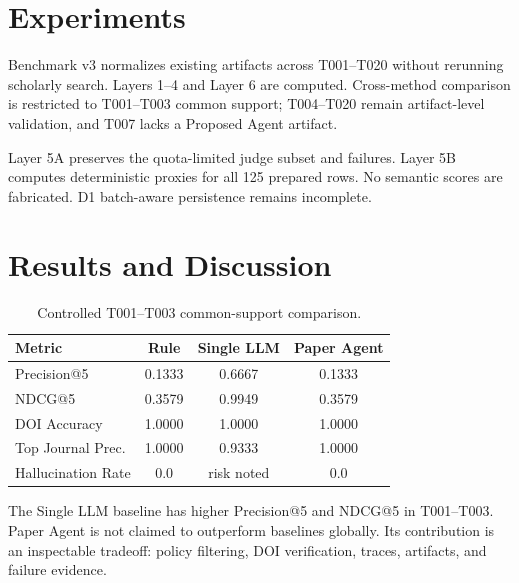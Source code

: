 \documentclass[10pt,twocolumn]{article}
\begin{document}
\section{Experiments}
Benchmark v3 normalizes existing artifacts across T001--T020 without rerunning scholarly search. Layers 1--4 and Layer 6 are computed. Cross-method comparison is restricted to T001--T003 common support; T004--T020 remain artifact-level validation, and T007 lacks a Proposed Agent artifact.

Layer 5A preserves the quota-limited judge subset and failures. Layer 5B computes deterministic proxies for all 125 prepared rows. No semantic scores are fabricated. D1 batch-aware persistence remains incomplete.

\section{Results and Discussion}
\begin{table}[t]\centering\footnotesize
\begin{tabular}{lccc}\toprule Metric & Rule & Single LLM & Paper Agent \\\midrule
Precision@5 & 0.1333 & 0.6667 & 0.1333 \\
NDCG@5 & 0.3579 & 0.9949 & 0.3579 \\
DOI Accuracy & 1.0000 & 1.0000 & 1.0000 \\
Top Journal Prec. & 1.0000 & 0.9333 & 1.0000 \\
Hallucination Rate & 0.0 & risk noted & 0.0 \\
\bottomrule\end{tabular}\caption{Controlled T001--T003 common-support comparison.}\label{tab:controlled}\end{table}
The Single LLM baseline has higher Precision@5 and NDCG@5 in T001--T003. Paper Agent is not claimed to outperform baselines globally. Its contribution is an inspectable tradeoff: policy filtering, DOI verification, traces, artifacts, and failure evidence.
\end{document}
